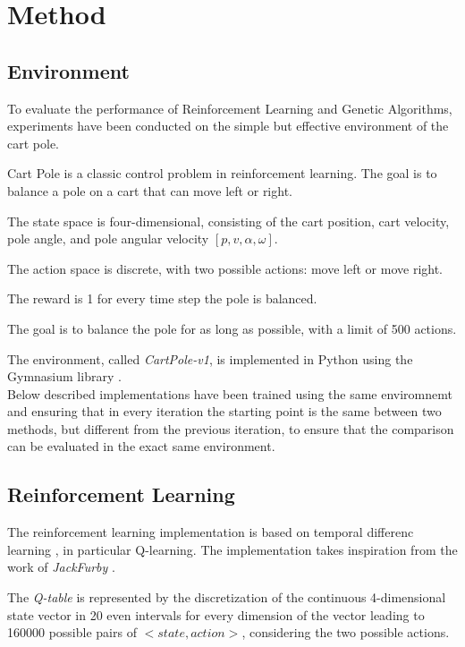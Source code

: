 \section{Method}

\subsection{Environment}

To evaluate the performance of Reinforcement Learning and Genetic Algorithms,
experiments have been conducted on the simple but effective environment of the cart pole.

Cart Pole is a classic control problem in reinforcement learning. 
The goal is to balance a pole on a cart that can move left or right. 

The state space is four-dimensional, consisting of the cart position, cart velocity, pole angle, and pole angular velocity $[p, v, \alpha, \omega]$. 

The action space is discrete, with two possible actions: move left or move right. 

The reward is 1 for every time step the pole is balanced.

The goal is to balance the pole for as long as possible, with a limit of 500 actions.

The environment, called \textit{CartPole-v1}, is implemented in Python using the Gymnasium library \cite{towers_gymnasium_2023}.
\\
Below described implementations have been trained using the same enviromnemt and ensuring that in every iteration the starting point is the same between two methods, but different from the previous iteration, to ensure that the comparison can be evaluated in the exact same environment.

\subsection{Reinforcement Learning}
The reinforcement learning implementation is based on temporal differenc learning \cite{sutton1998temporal}, 
in particular Q-learning.
The implementation takes inspiration from the work of \textit{JackFurby} \cite{JackFurbyCartPole}.

The \textit{Q-table} is represented by the discretization of the continuous 4-dimensional state vector in 20 even intervals for every dimension of the vector leading to 160000 possible pairs of $<state,action>$, considering the two possible actions.

